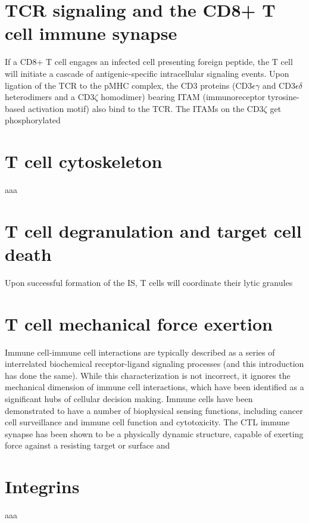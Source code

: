 \section{TCR signaling and the CD8+ T cell immune synapse}
If a CD8+ T cell engages an infected cell presenting foreign peptide, the T cell will initiate a cascade of antigenic-specific intracellular signaling events. Upon ligation of the TCR to the pMHC complex, the CD3 proteins (CD3$\epsilon \gamma$ and CD3$\epsilon \delta$ heterodimers and a CD3$\zeta$ homodimer) bearing ITAM (immunoreceptor tyrosine-based activation motif) also bind to the TCR. The ITAMs on the CD3$\zeta$ get phosphorylated 

\section{T cell cytoskeleton}
aaa 

\section{T cell degranulation and target cell death}
Upon successful formation of the IS, T cells will coordinate their lytic granules 

\section{T cell mechanical force exertion}
Immune cell-immune cell interactions are typically described as a series of interrelated biochemical receptor-ligand signaling processes (and this introduction has done the same). While this characterization is not incorrect, it ignores the mechanical dimension of immune cell interactions, which have been identified as a significant hubs of cellular decision making. Immune cells have been demonstrated to have a number of biophysical sensing functions, including cancer cell surveillance and immune cell function and cytotoxicity.
The CTL immune synapse has been shown to be a physically dynamic structure, capable of exerting force against a resisting target or surface and 

\section{Integrins}
aaa

